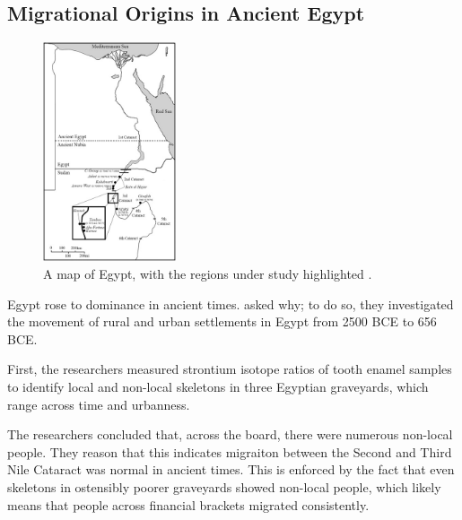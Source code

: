 \documentclass[a4paper, 12pt]{article}
\begin{document}
\subsection{Migrational Origins in Ancient Egypt}
\begin{figure}[ht]
    \centering
    \includegraphics[width=0.35\textwidth]{egypt_regions.jpg}
    \caption{A map of Egypt, with the regions under study highlighted \citep{schrader2019}. }
    \label{fig:egypt_regions}
\end{figure}

Egypt rose to dominance in ancient times. \cite{schrader2019} asked why; to do so,
they investigated the movement of rural and urban settlements in Egypt
from 2500 BCE to 656 BCE.

First, the researchers measured strontium isotope ratios of tooth enamel samples to
identify local and non-local skeletons in three Egyptian graveyards, which range
across time and urbanness.

The researchers concluded that, across the board, there were numerous non-local
people. They reason that this indicates migraiton between the Second and Third
Nile Cataract was normal in ancient times. This is enforced by the fact that
even skeletons in ostensibly poorer graveyards showed non-local people, which likely
means that people across financial brackets migrated consistently.

\end{document}
